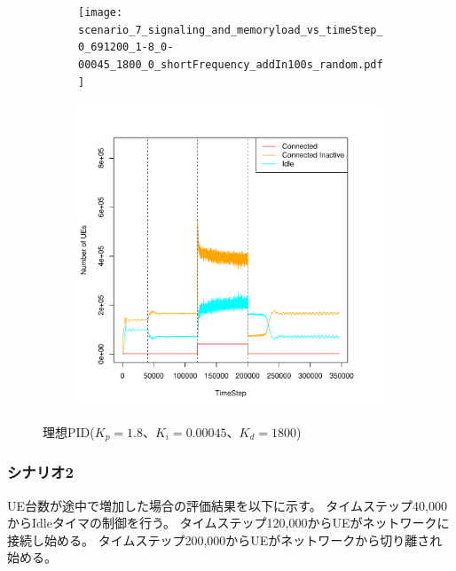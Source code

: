 \documentclass[a4j]{ujarticle}
\begin{document}
\begin{figure}[htbp]
\begin{subfigure}{0.49\hsize}
   \centering
   \texttt{[image: scenario\_7\_signaling\_and\_memoryload\_vs\_timeStep\_0\_691200\_1-8\_0-00045\_1800\_0\_shortFrequency\_addIn100s\_random.pdf]}
   \label{subfig:scenario_7_signaling_and_memoryload_vs_timeStep_0_691200_1-8_0-00045_1800_0_shortFrequency_addIn100s_random}
 \end{subfigure}
 \begin{subfigure}{0.49\hsize}
   \centering
   \includegraphics[width=1.0\hsize]{scenario_7_stateBreakdown_0_691200_1-8_0-00045_1800_0_shortFrequency_addIn100s_random.pdf}
   \label{subfig:scenario_7_stateBreakdown_0_691200_1-8_0-00045_1800_0_shortFrequency_addIn100s_random}
 \end{subfigure}
 \caption{理想PID($K_p = 1.8、K_i = 0.00045、K_d = 1800$)}
 \label{fig:result_pid_scenario7_shortFrequency_addIn100s_random}
\end{figure}
\clearpage


\subsubsection{シナリオ2}
UE台数が途中で増加した場合の評価結果を以下に示す。
タイムステップ40,000からIdleタイマの制御を行う。
タイムステップ120,000からUEがネットワークに接続し始める。
タイムステップ200,000からUEがネットワークから切り離され始める。
\end{document}
